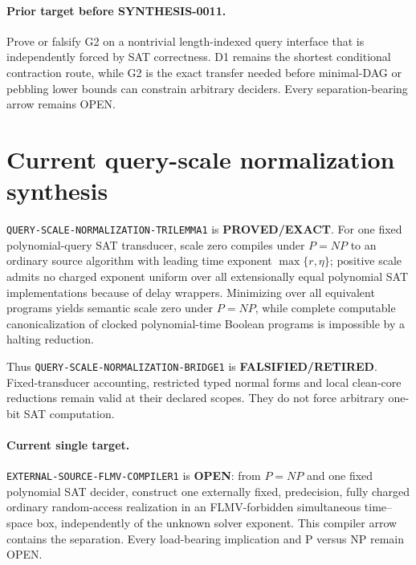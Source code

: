 \documentclass[11pt]{article}
\begin{document}
\paragraph{Prior target before SYNTHESIS-0011.}
Prove or falsify G2 on a nontrivial length-indexed query interface that is
independently forced by SAT correctness.  D1 remains the shortest conditional
contraction route, while G2 is the exact transfer needed before minimal-DAG or
pebbling lower bounds can constrain arbitrary deciders.  Every
separation-bearing arrow remains OPEN.

\section*{Current query-scale normalization synthesis}
\texttt{QUERY-SCALE-NORMALIZATION-TRILEMMA1} is
\textbf{PROVED/EXACT}.  For one fixed polynomial-query SAT transducer, scale
zero compiles under $P=NP$ to an ordinary source algorithm with leading time
exponent $\max\{r,\eta\}$; positive scale admits no charged exponent uniform
over all extensionally equal polynomial SAT implementations because of delay
wrappers.  Minimizing over all equivalent programs yields semantic scale zero
under $P=NP$, while complete computable canonicalization of clocked
polynomial-time Boolean programs is impossible by a halting reduction.

Thus \texttt{QUERY-SCALE-NORMALIZATION-BRIDGE1} is
\textbf{FALSIFIED/RETIRED}.  Fixed-transducer accounting, restricted typed
normal forms and local clean-core reductions remain valid at their declared
scopes.  They do not force arbitrary one-bit SAT computation.

\paragraph{Current single target.}
\texttt{EXTERNAL-SOURCE-FLMV-COMPILER1} is \textbf{OPEN}: from $P=NP$ and one
fixed polynomial SAT decider, construct one externally fixed, predecision,
fully charged ordinary random-access realization in an FLMV-forbidden
simultaneous time--space box, independently of the unknown solver exponent.
This compiler arrow contains the separation.  Every load-bearing implication
and P versus NP remain OPEN.

\end{document}
